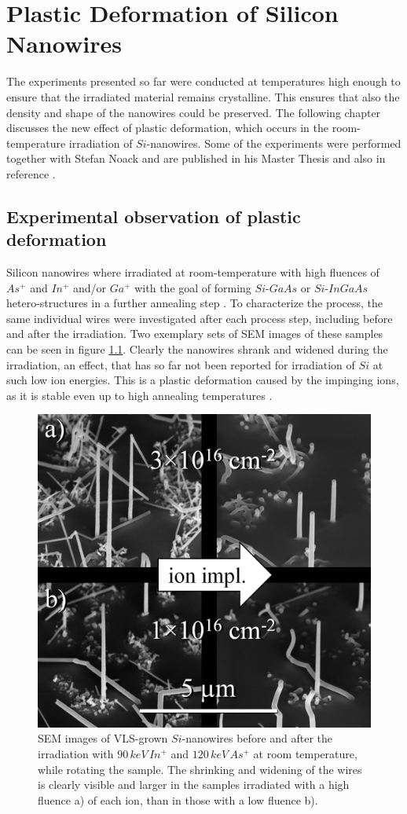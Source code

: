 \chapter{Plastic Deformation of Silicon Nanowires}

The experiments presented so far were conducted at temperatures high enough to ensure that the irradiated material remains crystalline. This ensures that also the density and shape of the nanowires could be preserved. The following chapter discusses the new effect of plastic deformation, which occurs in the room-temperature irradiation of $Si$-nanowires. Some of the experiments were performed together with Stefan Noack and are published in his Master Thesis \cite{noack_sputter_2014} and also in reference \cite{johannes_anomalous_2015}.

\section{Experimental observation of plastic deformation}
\label{sec:expdeformation}

Silicon nanowires where irradiated at room-temperature with high fluences of $As^+$ and $In^+$ and/or $Ga^+$ with the goal of forming $Si$-$GaAs$ or $Si$-$InGaAs$ hetero-structures in a further annealing step \cite{prucnal_iii-v_2014,glaser_personal_2015}. To characterize the process, the same individual wires were investigated after each process step, including before and after the irradiation. Two exemplary sets of SEM images of these samples can be seen in figure \ref{deformSEM}. Clearly the nanowires shrank and widened during the irradiation, an effect, that has so far not been reported for irradiation of $Si$ at such low ion energies. This is a plastic deformation caused by the impinging ions, as it is stable even up to high annealing temperatures \cite{prucnal_iii-v_2014,glaser_personal_2015}.

\begin{figure}
	\centering
		\includegraphics[width=.45\textwidth]{images/deformSEM.png}
	\caption{SEM images of VLS-grown $Si$-nanowires before and after the irradiation with $90\,keV\, In^+$ and $120\,keV\,As^+$ at room temperature, while rotating the sample. The shrinking and widening of the wires is clearly visible and larger in the samples irradiated with a high fluence a) of each ion, than in those with a low fluence b).} 
	\label{deformSEM}
\end{figure}

